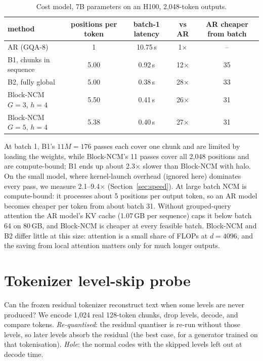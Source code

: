 \begin{table}[h]
\centering
\small
\caption{Cost model, 7B parameters on an H100, 2,048-token outputs.}
\begin{tabular}{@{}lcccc@{}}
\toprule
method & positions per token & batch-1 latency & vs AR & AR cheaper from batch \\
\midrule
AR (GQA-8) & 1 & 10.75\,s & 1$\times$ & -- \\
B1, chunks in sequence & 5.00 & 0.92\,s & 12$\times$ & 35 \\
B2, fully global & 5.00 & 0.38\,s & 28$\times$ & 33 \\
Block-NCM $G{=}3$, $h{=}4$ & 5.50 & 0.41\,s & 26$\times$ & 31 \\
Block-NCM $G{=}5$, $h{=}4$ & 5.38 & 0.40\,s & 27$\times$ & 31 \\
\bottomrule
\end{tabular}
\end{table}

At batch 1, B1's $11M{=}176$ passes each cover one chunk and are limited by loading the weights, while Block-NCM's
11 passes cover all 2,048 positions and are compute-bound; B1 ends up about 2.3$\times$ slower than Block-NCM
with halo. On the small model, where kernel-launch overhead (ignored here) dominates every pass, we measure
2.1--9.4$\times$ (Section~\ref{sec:speed}). At large batch NCM is compute-bound: it processes about 5 positions per
output token, so an AR model becomes cheaper per token from about batch 31. Without grouped-query attention the AR
model's KV cache (1.07\,GB per sequence) caps it below batch 64 on 80\,GB, and Block-NCM is cheaper at every feasible
batch. Block-NCM and B2 differ little at this size: attention is a small share of FLOPs at $d{=}4096$, and the
saving from local attention matters only for much longer outputs.

\section{Tokenizer level-skip probe}
\label{sec:probe}

Can the frozen residual tokenizer reconstruct text when some levels are never produced? We encode 1,024 real 128-token
chunks, drop levels, decode, and compare tokens. \emph{Re-quantised}: the residual quantiser is re-run without those
levels, so later levels absorb the residual (the best case, for a generator trained on that tokenisation).
\emph{Hole}: the normal codes with the skipped levels left out at decode time.

